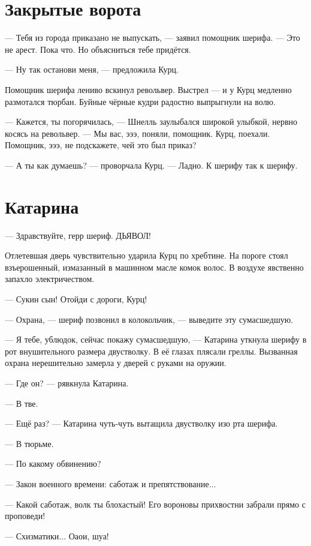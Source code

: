 \section{Закрытые ворота}

--- Тебя из города приказано не выпускать, --- заявил помощник шерифа.
--- Это не арест.
Пока что.
Но объясниться тебе придётся.

--- Ну так останови меня, --- предложила Курц.

Помощник шерифа лениво вскинул револьвер.
Выстрел --- и у Курц медленно размотался тюрбан.
Буйные чёрные кудри радостно выпрыгнули на волю.

--- Кажется, ты погорячилась, --- Шнелль заулыбался широкой улыбкой, нервно косясь на револьвер.
--- Мы вас, эээ, поняли, помощник.
Курц, поехали.
Помощник, эээ, не подскажете, чей это был приказ?

--- А ты как думаешь? --- проворчала Курц.
--- Ладно.
К шерифу так к шерифу.

\section{Катарина}

--- Здравствуйте, герр шериф.
ДЬЯВОЛ!

Отлетевшая дверь чувствительно ударила Курц по хребтине.
На пороге стоял взъерошенный, измазанный в машинном масле комок волос.
В воздухе явственно запахло электричеством.

--- Сукин сын!
Отойди с дороги, Курц!

--- Охрана, --- шериф позвонил в колокольчик, --- выведите эту сумасшедшую.

--- Я тебе, ублюдок, сейчас покажу сумасшедшую, --- Катарина уткнула шерифу в рот внушительного размера двустволку.
В её глазах плясали греллы.
Вызванная охрана нерешительно замерла у дверей с руками на оружии.

--- Где он? --- рявкнула Катарина.

--- В тве.

--- Ещё раз? --- Катарина чуть-чуть вытащила двустволку изо рта шерифа.

--- В тюрьме.

--- По какому обвинению?

--- Закон военного времени: саботаж и препятствование...

--- Какой саботаж, волк ты блохастый!
Его вороновы прихвостни забрали прямо с проповеди!

--- Схизматики...
Оаои, шуа!

